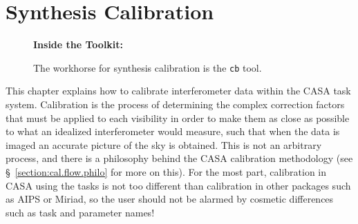 

\chapter{Synthesis Calibration}
\label{chapter:cal}

\begin{wrapfigure}{r}{2.5in}
  \begin{boxedminipage}{2.5in}
     \centerline{\bf Inside the Toolkit:}
     The workhorse for synthesis calibration is the {\tt cb} tool.
  \end{boxedminipage}
\end{wrapfigure}

This chapter explains how to calibrate interferometer
data within the CASA task system.  Calibration is the process
of determining the complex correction factors that must be 
applied to each visibility in order to make them as close as
possible to what an idealized interferometer would measure, such
that when the data is imaged an accurate picture of the sky
is obtained.  This is not an arbitrary process, and there is
a philosophy behind the CASA calibration methodology (see
\S~\ref{section:cal.flow.philo} for more on this).  For the most part,
calibration in CASA using the tasks is not too different than
calibration in other packages such as AIPS or Miriad, so the user
should not be alarmed by cosmetic differences such as task and
parameter names!

